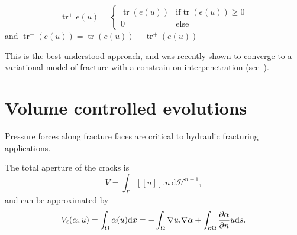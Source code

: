 \documentclass[10pt,oneside]{report}
\def\vDefP{{\texttt{vDefP}} }
\let\div\relax
\DeclareMathOperator*{\div}{div}
\DeclareMathOperator{\tr}{tr}
\newcommand{\jump}[1]{\ensuremath{[\![#1]\!]} }
\begin{document}
\begin{equation}
\tr^+ e(u) = \left\{
    \begin{array}{ll}
         \tr{(e(u))}  & \mbox{if}  \tr{(e(u))} \geq 0  \\
        0 & \mbox{else}
    \end{array}
\right.
\end{equation}
and $\tr ^-({e(u)}) = \tr({e(u)}) - \tr ^+({e(u)})$

This is the best understood approach, and was recently shown to converge to a variational model of fracture with a constrain on interpenetration (see~\cite{Chambolle-Conti-EtAl-2017a}).





\section{Volume controlled evolutions}

Pressure forces along fracture faces are critical to hydraulic fracturing applications.

The total aperture of the cracks is
$$ V = \int_{\Gamma} \jump{u} .n\, \mathrm{d}\mathcal{H}^{n-1},$$
and can be approximated by
$$ V_{\ell}(\alpha,u)=\int_{\Omega} \alpha \div{(u)} \mathrm{d}x= - \int_{\Omega} \nabla u . \nabla \alpha + \int_{\partial \Omega} \frac{\partial \alpha}{\partial n} u \mathrm{d}s.$$
\end{document}
